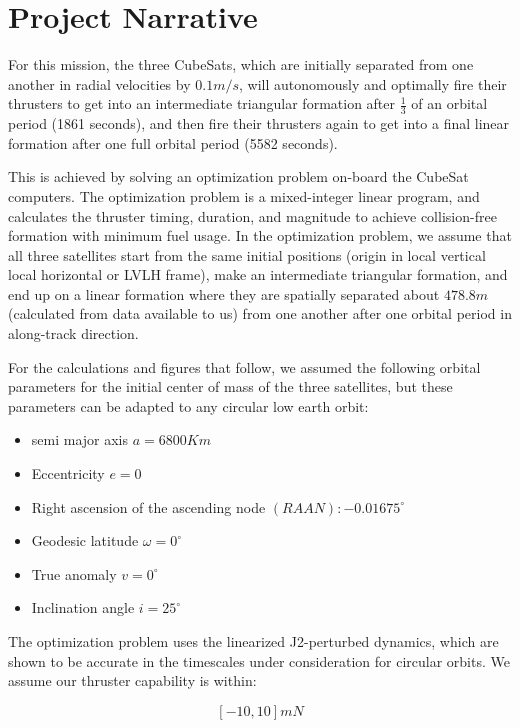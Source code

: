 \section{Project Narrative}


For this mission, the three CubeSats, which are initially separated
from one another in radial velocities by $0.1 m/s$, will autonomously
and optimally fire their thrusters to get into an intermediate
triangular formation after $\frac{1}{3}$ of an orbital period (1861
seconds), and then fire their thrusters again to get into a final
linear formation after one full orbital period (5582 seconds).

This is achieved by solving an optimization problem on-board the
CubeSat computers. The optimization problem is a mixed-integer linear
program, and calculates the thruster timing, duration, and magnitude
to achieve collision-free formation with minimum fuel usage. In the
optimization problem, we assume that all three satellites start from
the same initial positions (origin in local vertical local horizontal
or LVLH frame), make an intermediate triangular formation, and end up
on a linear formation where they are spatially separated about $478.8m$
(calculated from data available to us) from one another after one
orbital period in along-track direction.

For the calculations and figures that follow, we assumed the following
orbital parameters for the initial center of mass of the three
satellites, but these parameters can be adapted to any circular low
earth orbit:

\begin{itemize}
  \item semi major axis $a = 6800 Km$
  \item Eccentricity $e = 0$
  \item Right ascension of the ascending node $(RAAN):-0.01675^{\circ}$
  \item Geodesic latitude $\omega = 0^{\circ}$
  \item True anomaly $v = 0^{\circ}$
  \item Inclination angle $i = 25^{\circ}$
\end{itemize}

The optimization problem uses the linearized J2-perturbed dynamics,
which are shown to be accurate in the timescales under consideration
for circular orbits. We assume our thruster capability is within:

\[[-10, 10] mN\]

